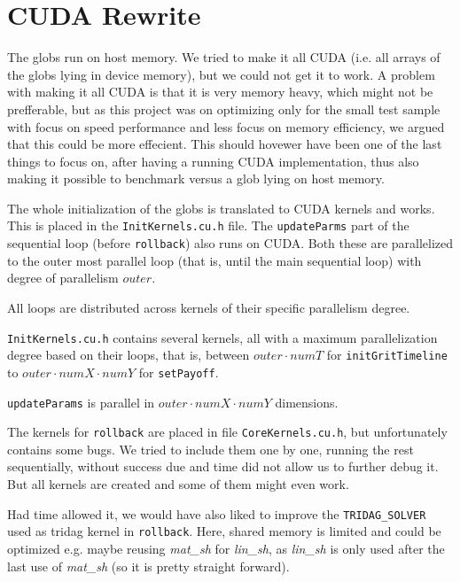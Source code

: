 \section{CUDA Rewrite}
The globs run on host memory. We tried to make it all CUDA (i.e. all arrays of the globs lying in device memory), but we could not get it to work. A problem with making it all CUDA is that it is very memory heavy, which might not be prefferable, but as this project was on optimizing only for the small test sample with focus on speed performance and less focus on memory efficiency, we argued that this could be more effecient. This should hovewer have been one of the last things to focus on, after having a running CUDA implementation, thus also making it possible to benchmark versus a glob lying on host memory.

The whole initialization of the globs is translated to CUDA kernels and works. This is placed in the \texttt{InitKernels.cu.h} file. The \texttt{updateParms} part of the sequential loop (before \texttt{rollback}) also runs on CUDA. Both these are parallelized to the outer most parallel loop (that is, until the main sequential loop) with degree of parallelism $outer$. 

All loops are distributed across kernels of their specific parallelism degree.

\texttt{InitKernels.cu.h} contains several kernels, all with a maximum parallelization degree based on their loops, that is, between $outer\cdot numT$ for \texttt{initGritTimeline} to $outer\cdot numX \cdot numY$ for \texttt{setPayoff}.

\texttt{updateParams} is parallel in $outer\cdot numX \cdot numY$ dimensions. 

The kernels for \texttt{rollback} are placed in file \texttt{CoreKernels.cu.h}, but unfortunately contains some bugs. We tried to include them one by one, running the rest sequentially, without success due and time did not allow us to further debug it. But all kernels are created and some of them might even work.

Had time allowed it, we would have also liked to improve the \texttt{TRIDAG_SOLVER} used as tridag kernel in \texttt{rollback}. Here, shared memory is limited and could be optimized e.g. maybe reusing \textit{mat\_sh} for \textit{lin\_sh}, as \textit{lin\_sh} is only used after the last use of \textit{mat\_sh} (so it is pretty straight forward). 